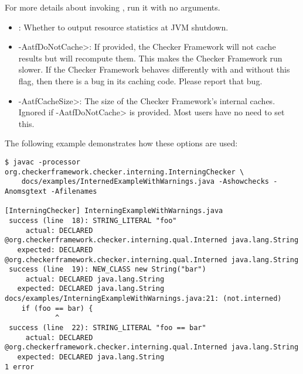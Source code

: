For more details about invoking
, run it with
no arguments.



\begin{itemize}

\item {}:
  Whether to output resource statistics at JVM shutdown.

\item \<-AatfDoNotCache>:
  If provided, the Checker Framework will not cache results but will
  recompute them.  This makes the Checker Framework run slower.  If the
  Checker Framework behaves differently with and without this flag, then
  there is a bug in its caching code.  Please report that bug.

\item \<-AatfCacheSize>:
  The size of the Checker Framework's internal caches.
  Ignored if \<-AatfDoNotCache> is provided.
  Most users have no need to set this.

\end{itemize}



The following example demonstrates how these options are used:

\begin{smaller}
\begin{Verbatim}
$ javac -processor org.checkerframework.checker.interning.InterningChecker \
    docs/examples/InternedExampleWithWarnings.java -Ashowchecks -Anomsgtext -Afilenames

[InterningChecker] InterningExampleWithWarnings.java
 success (line  18): STRING_LITERAL "foo"
     actual: DECLARED @org.checkerframework.checker.interning.qual.Interned java.lang.String
   expected: DECLARED @org.checkerframework.checker.interning.qual.Interned java.lang.String
 success (line  19): NEW_CLASS new String("bar")
     actual: DECLARED java.lang.String
   expected: DECLARED java.lang.String
docs/examples/InterningExampleWithWarnings.java:21: (not.interned)
    if (foo == bar) {
            ^
 success (line  22): STRING_LITERAL "foo == bar"
     actual: DECLARED @org.checkerframework.checker.interning.qual.Interned java.lang.String
   expected: DECLARED java.lang.String
1 error
\end{Verbatim}
\end{smaller}

